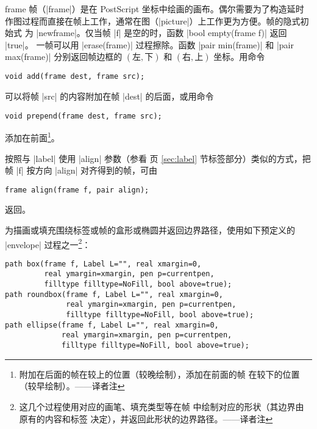\documentclass{ctexbook}
\makeatletter
\newenvironment{typelist}{\itemize
  \let\old@item\@item
  \def\@item[##1]{\expandafter\old@item[\ttfamily\color{type!50!black}##1]}}
{\enditemize}
\newcommand*\prgname[1]{\textsf{#1}}
\newcommand\transnote[1]{\footnote{#1——译者注}}
\makeatother
\begin{document}
\begin{typelist}
\item[frame]
帧（|frame|）是在 \prgname{PostScript} 坐标中绘画的画布。偶尔需要为了构造延时
作图过程而直接在帧上工作，通常在图（|picture|）上工作更为方便。帧的隐式初始式
为 |newframe|。仅当帧 |f| 是空的时，函数 |bool empty(frame f)| 返回 |true|。
一帧可以用 |erase(frame)| 过程擦除。函数 |pair min(frame)| 和
|pair max(frame)| 分别返回帧边框的 $(\text{左},\text{下})$ 和 $(\text{右},
\text{上})$ 坐标。用命令
\begin{lstlisting}
void add(frame dest, frame src);
\end{lstlisting}
可以将帧 |src| 的内容附加在帧 |dest| 的后面，或用命令
\begin{lstlisting}
void prepend(frame dest, frame src);
\end{lstlisting}
添加在前面\transnote{附加在后面的帧在较上的位置（较晚绘制），添加在前面的帧
在较下的位置（较早绘制）。}。

按照与 |label| 使用 |align| 参数（参看 \pageref{sec:label} 页 \ref{sec:label}
节标签部分）类似的方式，把帧 |f| 按方向 |align| 对齐得到的帧，可由
\begin{lstlisting}
frame align(frame f, pair align);
\end{lstlisting}
返回。

为描画或填充围绕标签或帧的盒形或椭圆并返回边界路径，使用如下预定义的
|envelope| 过程之一\transnote{这几个过程使用对应的画笔、填充类型等在帧
 中绘制对应的形状（其边界由 \inlinecode{f} 原有的内容和标签
\inlinecode{L} 决定），并返回此形状的边界路径。}：
\begin{lstlisting}
path box(frame f, Label L="", real xmargin=0,
         real ymargin=xmargin, pen p=currentpen,
         filltype filltype=NoFill, bool above=true);
path roundbox(frame f, Label L="", real xmargin=0,
              real ymargin=xmargin, pen p=currentpen,
              filltype filltype=NoFill, bool above=true);
path ellipse(frame f, Label L="", real xmargin=0,
             real ymargin=xmargin, pen p=currentpen,
             filltype filltype=NoFill, bool above=true);
\end{lstlisting}


\end{typelist}
\end{document}

